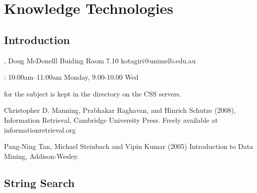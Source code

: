\section{Knowledge Technologies}
\subsection{Introduction}

\lstset{language=Java}

\begin{compactitem}
\item {}, Doug McDonelll Buiding Room 7.10
kotagiri@unimelb.edu.au
\item {}: 10:00am–11:00am Monday, 9.00-10.00 Wed
\item {} for the subject is kept in the directory  on the CSS servers.
\item Christopher D. Manning, Prabhakar Raghavan, and Hinrich Schutze
(2008), Information Retrieval, Cambridge University Press.
Freely available at informationretrieval.org
\item Pang-Ning Tan, Michael Steinbach and Vipin Kumar (2005)
Introduction to Data Mining, Addison-Wesley.
\end{compactitem}

\subsection{String Search}

